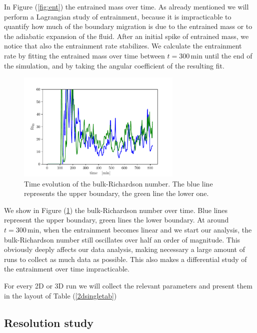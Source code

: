In Figure (\ref{fig:ent}) the entrained mass over time. As already mentioned we will perform a Lagrangian study of entrainment, because it is impracticable to quantify how much of the boundary migration is due to the entrained mass or to the adiabatic expansion of the fluid. After an initial spike of entrained mass, we notice that also the entrainment rate stabilizes. We calculate the entrainment rate by fitting the entrained mass over time between $t = 300 \, \mathrm{min}$ until the end of the simulation, and by taking the angular coefficient of the resulting fit. 

\begin{figure}[t!]
\centering
\includegraphics[width=0.7\textwidth]{./img/bulk.pdf}
\caption{Time evolution of the bulk-Richardson number. The blue line represents the upper boundary, the green line the lower one.}
\label{fig:bulk}
\centering
\end{figure}
We show in Figure (\ref{fig:bulk}) the bulk-Richardson number over time. Blue lines represent the upper boundary, green lines the lower boundary. At around $t=\mathrm{300 \, min}$, when the entrainment becomes linear and we start our analysis, the bulk-Richardson number still oscillates over half an order of magnitude. This obviously deeply affects our data analysis, making necessary a large amount of runs to collect as much data as possible. This also makes a differential study of the entrainment over time impracticable. 

For every 2D or 3D run we will collect the relevant parameters and present them in the layout of Table (\ref{2dsingletab})

\subsection{Resolution study}

